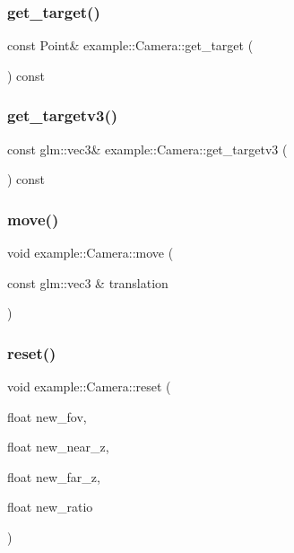 \mbox{\label{classexample_1_1_camera_a559bad945679ef774c9979e45880c9dc}} 
\subsubsection{get\_target()}
{\footnotesize\ttfamily const Point\& example\+::\+Camera\+::get\+\_\+target (\begin{DoxyParamCaption}{ }\end{DoxyParamCaption}) const\hspace{0.3cm}{\ttfamily [inline]}}

\mbox{\label{classexample_1_1_camera_a3286fb3236ba5981fae1aa40eb552744}} 
\subsubsection{get\_targetv3()}
{\footnotesize\ttfamily const glm\+::vec3\& example\+::\+Camera\+::get\+\_\+targetv3 (\begin{DoxyParamCaption}{ }\end{DoxyParamCaption}) const\hspace{0.3cm}{\ttfamily [inline]}}

\mbox{\label{classexample_1_1_camera_a076f2b136b38a50738827c93712689e4}} 
\subsubsection{move()}
{\footnotesize\ttfamily void example\+::\+Camera\+::move (\begin{DoxyParamCaption}\item[{const glm\+::vec3 \&}]{translation }\end{DoxyParamCaption})\hspace{0.3cm}{\ttfamily [inline]}}

\mbox{\label{classexample_1_1_camera_a5c8b855f8570626c91bc25f7014fb90e}} 
\subsubsection{reset()}
{\footnotesize\ttfamily void example\+::\+Camera\+::reset (\begin{DoxyParamCaption}\item[{float}]{new\+\_\+fov,  }\item[{float}]{new\+\_\+near\+\_\+z,  }\item[{float}]{new\+\_\+far\+\_\+z,  }\item[{float}]{new\+\_\+ratio }\end{DoxyParamCaption})\hspace{0.3cm}{\ttfamily [inline]}}

